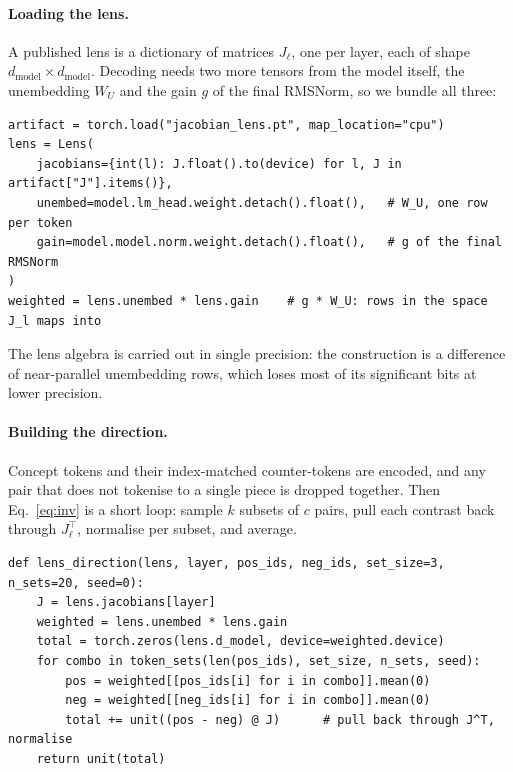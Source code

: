 \documentclass{article}
\begin{document}
\paragraph{Loading the lens.}
A published lens is a dictionary of matrices $J_\ell$, one per layer, each of shape $d_{\mathrm{model}} \times d_{\mathrm{model}}$. Decoding needs two more tensors from the model itself, the unembedding $W_U$ and the gain $g$ of the final RMSNorm, so we bundle all three:

\newpage
\begin{lstlisting}[caption={The lens and the model pieces it decodes through.},label={lst:lens}]
artifact = torch.load("jacobian_lens.pt", map_location="cpu")
lens = Lens(
    jacobians={int(l): J.float().to(device) for l, J in artifact["J"].items()},
    unembed=model.lm_head.weight.detach().float(),   # W_U, one row per token
    gain=model.model.norm.weight.detach().float(),   # g of the final RMSNorm
)
weighted = lens.unembed * lens.gain    # g * W_U: rows in the space J_l maps into
\end{lstlisting}

The lens algebra is carried out in single precision: the construction is a difference of near-parallel unembedding rows, which loses most of its significant bits at lower precision.

\paragraph{Building the direction.}
Concept tokens and their index-matched counter-tokens are encoded, and any pair that does not tokenise to a single piece is dropped together. Then Eq.~\ref{eq:inv} is a short loop: sample $k$ subsets of $c$ pairs, pull each contrast back through $J_\ell^\top$, normalise per subset, and average.

\begin{lstlisting}[caption={Lens inversion, Eq.~\ref{eq:inv}. Setting \texttt{J = I} gives the $J{=}I$ control.},label={lst:inv}]
def lens_direction(lens, layer, pos_ids, neg_ids, set_size=3, n_sets=20, seed=0):
    J = lens.jacobians[layer]
    weighted = lens.unembed * lens.gain
    total = torch.zeros(lens.d_model, device=weighted.device)
    for combo in token_sets(len(pos_ids), set_size, n_sets, seed):
        pos = weighted[[pos_ids[i] for i in combo]].mean(0)
        neg = weighted[[neg_ids[i] for i in combo]].mean(0)
        total += unit((pos - neg) @ J)      # pull back through J^T, normalise
    return unit(total)
\end{lstlisting}
\end{document}

